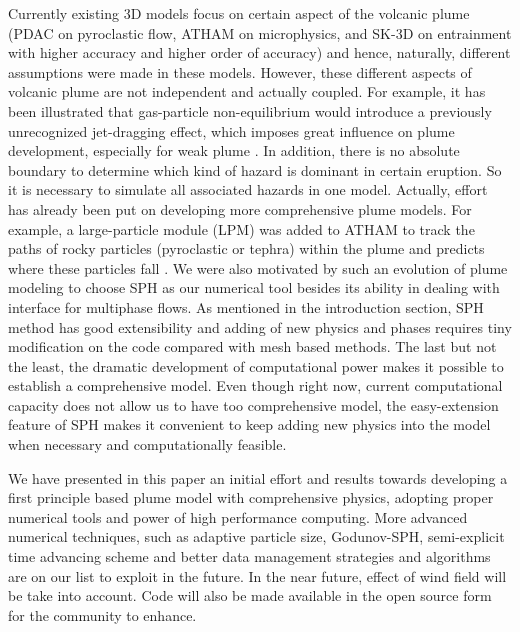 \documentclass[journal abbreviation, manuscript]{copernicus}
\begin{document}
Currently existing 3D models focus on certain aspect of the volcanic plume (PDAC on pyroclastic flow, ATHAM on microphysics, and SK-3D on entrainment with higher accuracy and higher order of accuracy) and hence, naturally, different assumptions were made in these models. However, these different aspects of volcanic plume are not independent and actually coupled. For example, it has been illustrated that gas-particle non-equilibrium would introduce a previously unrecognized jet-dragging effect, which imposes great influence on plume development, especially for weak plume \cite{cerminara2016large}. In addition, there is no absolute boundary to determine which kind of hazard is dominant in certain eruption. So it is necessary to simulate all associated hazards in one model. Actually, effort has already been put on developing more comprehensive plume models. For example, a large-particle module (LPM) was added to ATHAM to track the paths of rocky particles (pyroclastic or tephra) within the plume and predicts where these particles fall \citep{kobs2009modeling}. We were also motivated by such an evolution of plume modeling to choose SPH as our numerical tool besides its ability in dealing with interface for multiphase flows. As mentioned in the introduction section, SPH method has good extensibility and adding of new physics and phases requires tiny modification on the code compared with mesh based methods. The last but not the least, the dramatic development of computational power makes it possible to establish a comprehensive model. Even though right now, current computational capacity does not allow us to have too comprehensive model, the easy-extension feature of SPH makes it convenient to keep adding new physics into the model when necessary and computationally feasible. 

We have presented in this paper an initial effort and results towards developing a first principle based plume model with comprehensive physics, adopting proper numerical tools and power of high performance computing. More advanced numerical techniques, such as adaptive particle size, Godunov-SPH, semi-explicit time advancing scheme and better data management strategies and algorithms are on our list to exploit in the future. In the near future, effect of wind field will be take into account. Code will also be made available in the open source form for the community to enhance.
\end{document}
